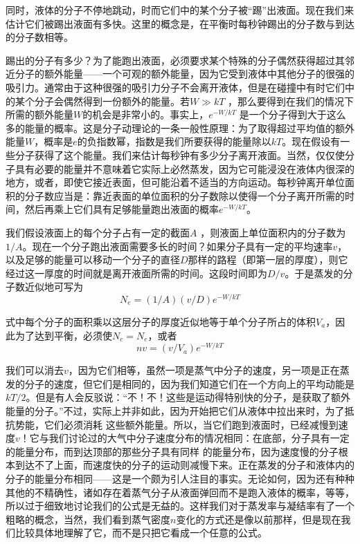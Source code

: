 同时，液体的分子不停地跳动，时而它们中的某个分子被“踢”出液面。现在我们来估计它们被踢出液面有多快。这里的概念是，在平衡时每秒钟踢出的分子数与到达的分子数相等。

踢出的分子有多少？为了能跑出液面，必须要求某个特殊的分子偶然获得超过其邻近分子的额外能量——一个可观的额外能量，因为它受到液体中其他分子的很强的吸引力。通常由于这种很强的吸引力分子不会离开液体，但是在碰撞中有时它们中的某个分子会偶然得到一份额外的能量。若$W\gg kT$ ，那么要得到在我们的情况下所需的额外能量$W$的机会是非常小的。事实上，$e^{-W/kT}$ 是一个分子得到大于这么多的能量的概率。这是分子动理论的一条一般性原理：为了取得超过平均值的额外能量$W$，概率是$e$的负指数幂，指数是我们所要获得的能量除以$kT$。现在假设有一些分子获得了这个能量。我们来估计每秒钟有多少分子离开液面。当然，仅仅使分子具有必要的能量并不意味着它实际上必然蒸发，因为它可能浸没在液体内很深的地方，或者，即使它接近表面，但可能沿着不适当的方向运动。每秒钟离开单位面积的分子数应当是：靠近表面的单位面积的分子数除以使得一个分子离开所需的时间，然后再乘上它们具有足够能量跑出液面的概率$e^{-W/kT}$。

我们假设液面上的每个分子占有一定的截面$A$ ，则液面上单位面积内的分子数为$1/A$。现在一个分子跑出液面需要多长的时间？如果分子具有一定的平均速率$v$，以及足够的能量可以移动一个分子的直径$D$那样的路程（即第一层的厚度），则它经过这一厚度的时间就是离开液面所需的时间。这段时间即为$D/v$。于是蒸发的分子数近似地可写为
\begin{equation}
    \label{Eq:I:42:3}
    N_e=(1/A)(v/D)e^{-W/kT}
\end{equation}

式中每个分子的面积乘以这层分子的厚度近似地等于单个分子所占的体积$V_a$，因此为了达到平衡，必须使$N_c=N_e$，或者
\begin{equation}
    \label{Eq:I:42:4}
    nv=(v/V_a)e^{-W/kT}
\end{equation}

我们可以消去$v$，因为它们相等，虽然一项是蒸气中分子的速度，另一项是正在蒸发的分子的速度，但它们是相同的，因为我们知道它们在一个方向上的平均动能是$kT/2$。但是有人会反驳说：“不！不！这些是运动得特别快的分子，是获取了额外能量的分子。”不过，实际上并非如此，因为开始把它们从液体中拉出来时，为了抵抗势能，它们必须消耗 这些额外能量。所以，当它们跑到液面时，已经减慢到速度$v$！它与我们讨论过的大气中分子速度分布的情况相同：在底部，分子具有一定的能量分布，而到达顶部的那些分子具有同样 的能量分布，因为速度慢的分子根本到达不了上面，而速度快的分子的运动则减慢下来。正在蒸发的分子和液体内的分子的能量分布相同——这是一个颇为引人注目的事实。无论如何，因为还有种种其他的不精确性，诸如存在着蒸气分子从液面弹回而不是跑入液体的概率，等等，所以过于细致地讨论我们的公式是无益的。这样我们对于蒸发率与凝结率有了一个粗略的概念，当然，我们看到蒸气密度$n$变化的方式还是像以前那样，但是现在我们比较具体地理解了它，而不是只把它看成一个任意的公式。

